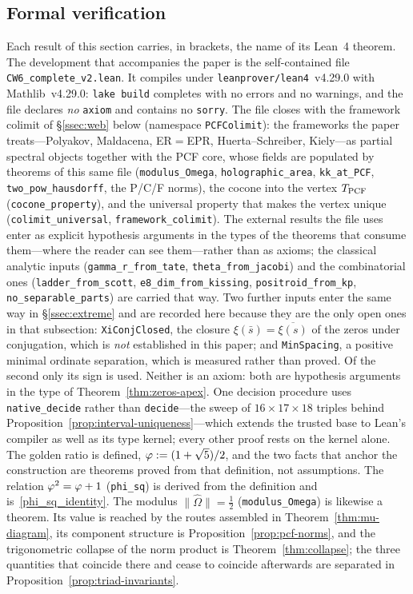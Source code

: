 \subsection{Formal verification}\label{ssec:status}

Each result of this section carries, in brackets, the name of its Lean~4
theorem. The development that accompanies the paper is the self-contained
file \texttt{CW6\_complete\_v2.lean}. It compiles under \texttt{leanprover/lean4}~v4.29.0 with
Mathlib~v4.29.0: \texttt{lake build} completes with no errors and no warnings, and the file
declares \emph{no} \texttt{axiom} and contains no \texttt{sorry}. The file closes with the
framework colimit of \S\ref{ssec:web} below (namespace \texttt{PCFColimit}): the frameworks the paper
treats---Polyakov, Maldacena, ER$=$EPR, Huerta--Schreiber, Kiely---as partial spectral objects
together with the PCF core, whose fields are populated by theorems of this same file
(\texttt{modulus\_Omega}, \texttt{holographic\_area}, \texttt{kk\_at\_PCF},
\texttt{two\_pow\_hausdorff}, the P/C/F norms), the cocone into the vertex $T_{\mathrm{PCF}}$
(\texttt{cocone\_property}), and the universal property that makes the vertex unique
(\texttt{colimit\_universal}, \texttt{framework\_colimit}).
The external results the file uses
enter as explicit hypothesis arguments in the types of the theorems that consume them---where
the reader can see them---rather than as axioms; the classical analytic inputs
(\texttt{gamma\_r\_from\_tate}, \texttt{theta\_from\_jacobi}) and the combinatorial ones
(\texttt{ladder\_from\_scott}, \texttt{e8\_dim\_from\_kissing}, \texttt{positroid\_from\_kp},
\texttt{no\_separable\_parts}) are carried that way. Two further inputs enter the same way in
\S\ref{ssec:extreme} and are recorded here because they are the only open ones in that
subsection: \texttt{XiConjClosed}, the closure $\xi(\bar s)=\overline{\xi(s)}$ of the zeros
under conjugation, which is \emph{not} established in this paper; and
\texttt{MinSpacing}, a positive minimal ordinate separation, which is measured rather than
proved. Of the second only its sign is used. Neither is an axiom: both are hypothesis
arguments in the type of Theorem~\ref{thm:zeros-apex}. One decision procedure uses
\texttt{native\_decide} rather than \texttt{decide}---the sweep of $16\times17\times18$ triples behind
Proposition~\ref{prop:interval-uniqueness}---which extends the trusted base to Lean's compiler
as well as its type kernel; every other proof rests on the kernel alone. The golden ratio is
defined, $\varphi:=(1+\sqrt5)/2$, and the two facts that anchor the
construction are theorems proved from that definition, not assumptions. The
relation $\varphi^2=\varphi+1$ (\texttt{phi\_sq}) is derived from the
definition and is~\eqref{phi_sq_identity}. The modulus $\|\hat\Omega\|=\tfrac12$
(\texttt{modulus\_Omega}) is likewise a theorem. Its value is reached by the routes assembled in
Theorem~\ref{thm:mu-diagram}, its component structure is
Proposition~\ref{prop:pcf-norms}, and the trigonometric collapse of the norm product is
Theorem~\ref{thm:collapse}; the three quantities that coincide there and cease to coincide
afterwards are separated in Proposition~\ref{prop:triad-invariants}.

